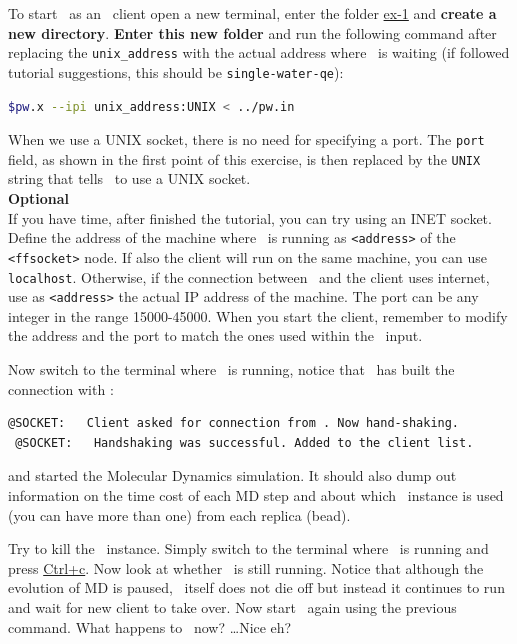 \documentclass{article}
\begin{document}
\begin{Exercise}[label={i-pi},title={PIMD: a client/server approach}]
To start \pwx\ as an \ipi\ client open a new terminal, enter the
folder \url{ex-1} and \textbf{create a new directory}. \textbf{Enter this new folder} and run the
following command after replacing the \texttt{unix\_address} with the
actual address where \ipi\ is waiting (if followed tutorial
suggestions, this should be \texttt{single-water-qe}):
\begin{lstlisting}[language=bash]
$pw.x --ipi unix_address:UNIX < ../pw.in
\end{lstlisting}%
When we use a UNIX socket, there is no need for specifying a port. The
\texttt{port} field, as shown in the first point of this exercise, is
then replaced by the \texttt{UNIX} string that tells \pwx\ to use a
UNIX socket. \\

\textbf{Optional}\\
If you have time, after finished the tutorial, you can
try using an INET socket. Define the address of the machine
where \ipi\ is running as \texttt{<address>} of the
\texttt{<ffsocket>} node. If also the client will run on the same
machine, you can use \texttt{localhost}. Otherwise, if the connection
between \ipi\ and the client uses internet, use as \texttt{<address>}
the actual IP address of the machine. The port can be any integer
in the range 15000-45000. When you start the client, remember to
modify the address and the port to match the ones used within the \ipi\
input.

\Question
Now switch to the terminal where \ipi\ is running, notice
that \ipi\ has built the connection with \pwx:
\begin{lstlisting}[language=sh]
 @SOCKET:   Client asked for connection from . Now hand-shaking.
 @SOCKET:   Handshaking was successful. Added to the client list.
\end{lstlisting}
and started the Molecular Dynamics simulation.
It should also dump out information on the time cost of each MD step
and about which \pwx\ instance is used (you can have more than one)
from each replica (bead).

\Question
Try to kill the \pwx\ instance.  Simply switch to the
terminal where \pwx\ is running and press \url{Ctrl+c}.  Now look at
whether \ipi\ is still running.  Notice that although the evolution of
MD is paused, \ipi\ itself does not die off but instead it continues to
run and wait for new client to take over.  Now start \pwx\ again using
the previous command.
What happens to \ipi\ now?  \ldots Nice eh?



\end{Exercise}
\end{document}
